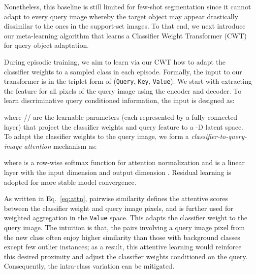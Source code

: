 \documentclass[10pt,twocolumn,letterpaper]{article}
\begin{document}
Nonetheless, this baseline is still limited for few-shot segmentation
since it cannot adapt to every query image whereby the target object may appear drastically dissimilar to the ones in the support-set images.
To that end, we next introduce our meta-learning algorithm that learns a Classifier Weight Transformer (CWT) for query object adaptation.













During episodic training, 
we aim to learn via our CWT  how to  adapt the classifier weights  to a sampled class in each episode.
Formally, the input to our transformer 
is in the triplet form of
(\texttt{Query}, \texttt{Key}, \texttt{Value}). 
We start with extracting the feature  for all  pixels of the query image using the encoder and decoder. 
To learn discriminative query conditioned information,
the input is designed as:

where //
are the learnable parameters 
(each represented by a fully connected layer) 
that project the classifier weights and query feature to a -D latent space.
To adapt the classifier weights to the query image,
we form a {\em classifier-to-query-image attention} mechanism 
as:

where  is a row-wise softmax function for attention normalization and  is a linear layer with the input dimension  and output dimension .
Residual learning is adopted for more stable model convergence.


As written in Eq.~\eqref{eq:attn}, pairwise similarity 
defines the attentive scores between the classifier weight and query image pixels,
and is further used for weighted aggregation in the \texttt{Value} space.
This adapts the classifier weight to the query image.
The intuition is that, the pairs involving a query image pixel from the new class often enjoy higher similarity than those with background classes except few outlier instances; as a result, this attentive learning would reinforce this desired proximity and adjust the classifier weights conditioned on the query.
Consequently, the intra-class variation can be mitigated. 
\end{document}
